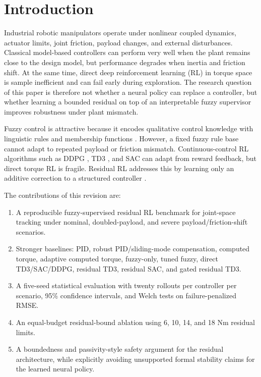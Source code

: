 \documentclass[reprint,amsmath,amssymb,aps,pra]{revtex4-2}
\begin{document}
\section{Introduction}

Industrial robotic manipulators operate under nonlinear coupled dynamics, actuator limits, joint friction, payload changes, and external disturbances. Classical model-based controllers can perform very well when the plant remains close to the design model, but performance degrades when inertia and friction shift. At the same time, direct deep reinforcement learning (RL) in torque space is sample inefficient and can fail early during exploration. The research question of this paper is therefore not whether a neural policy can replace a controller, but whether learning a bounded residual on top of an interpretable fuzzy supervisor improves robustness under plant mismatch.

Fuzzy control is attractive because it encodes qualitative control knowledge with linguistic rules and membership functions \cite{zadeh1965fuzzy,mamdani1975linguistic}. However, a fixed fuzzy rule base cannot adapt to repeated payload or friction mismatch. Continuous-control RL algorithms such as DDPG \cite{lillicrap2016ddpg}, TD3 \cite{fujimoto2018td3}, and SAC \cite{haarnoja2018sac} can adapt from reward feedback, but direct torque RL is fragile. Residual RL addresses this by learning only an additive correction to a structured controller \cite{johannink2019residual}.

The contributions of this revision are:
\begin{enumerate}
    \item A reproducible fuzzy-supervised residual RL benchmark for joint-space tracking under nominal, doubled-payload, and severe payload/friction-shift scenarios.
    \item Stronger baselines: PID, robust PID/sliding-mode compensation, computed torque, adaptive computed torque, fuzzy-only, tuned fuzzy, direct TD3/SAC/DDPG, residual TD3, residual SAC, and gated residual TD3.
    \item A five-seed statistical evaluation with twenty rollouts per controller per scenario, 95\% confidence intervals, and Welch tests on failure-penalized RMSE.
    \item An equal-budget residual-bound ablation using 6, 10, 14, and 18 Nm residual limits.
    \item A boundedness and passivity-style safety argument for the residual architecture, while explicitly avoiding unsupported formal stability claims for the learned neural policy.
\end{enumerate}
\end{document}
